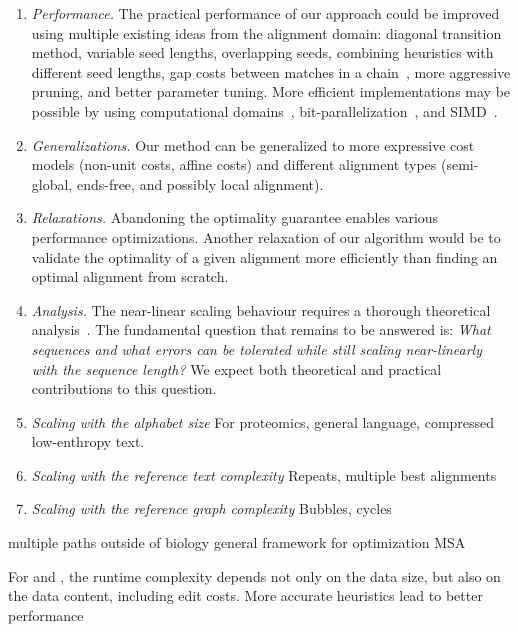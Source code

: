 \begin{enumerate}
    \item \emph{Performance.} The practical performance of our \A approach could
        be improved using multiple existing ideas from the alignment domain:
        diagonal transition method, variable seed lengths, overlapping seeds,
        combining heuristics with different seed lengths, gap costs between
        matches in a chain~\citep{ukkonen1985algorithms,wilbur1984context}, more
        aggressive pruning, and better parameter tuning. More efficient
        implementations may be possible by using computational
        domains~\citep{spouge1989speeding}, bit-parallelization~\citep{myers1999fast},
        and SIMD~\citep{marco2021fast}.
    \item \emph{Generalizations.} Our method can be generalized to more
        expressive cost models (non-unit costs, affine costs) and different alignment
        types (semi-global, ends-free, and possibly local alignment).
    \item \emph{Relaxations.} Abandoning the optimality guarantee
        enables various performance optimizations. Another relaxation
        of our algorithm would be to validate the optimality of a given alignment more
        efficiently than finding an optimal alignment from scratch.
    \item \emph{Analysis.} The near-linear scaling behaviour requires a thorough
        theoretical analysis~\citep{medvedev2022limitations}. The fundamental
        question that remains to be answered is: \emph{What sequences and what
        errors can be tolerated while still scaling near-linearly with the
        sequence length?} We expect both theoretical and practical contributions
        to this question.
    \item \emph{Scaling with the alphabet size} For proteomics, general
        language, compressed low-enthropy text.
    \item \emph{Scaling with the reference text complexity} Repeats, multiple
        best alignments
    \item \emph{Scaling with the reference graph complexity} Bubbles, cycles
\end{enumerate}

multiple paths
outside of biology
general framework for optimization
MSA

For \dijkstra and \astarix, the runtime complexity depends not only on the data
size, but also on the data content, including edit costs. More accurate
heuristics lead to better \A performance~\cite{pearl_discovery_1983}

